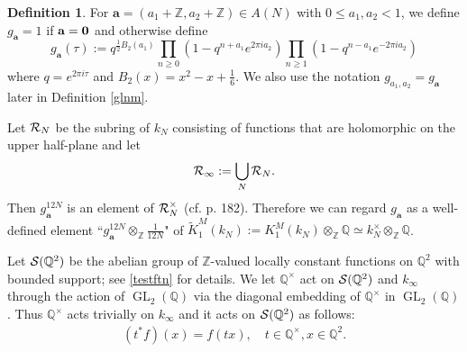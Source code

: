 \documentclass[12pt,amstex,amssymb]{article}
\theoremstyle{plain}
\theoremstyle{definition}
\newtheorem{definition}[theorem]{Definition}
\def\cR{{\cal R}}
\def\cS{{\cal S}}
\def\Z{{\mathbb Z}}
\def\Q{{\mathbb Q}}
\newcommand{\be}{\begin{eqnarray*}}
\newcommand{\ee}{\end{eqnarray*}}
\newcommand{\GL}{\operatorname{GL}}
\newcommand{\ba}{\mathbf{a}}
\newcommand{\bb}{\mathbf{b}}
\begin{document}
\begin{definition}\label{Siegelunits}\cite[Definition 1.1]{Bru}
For $\ba = (a_1 + \Z, a_2 +\Z)\in A(N)$ with $0\le a_1,a_2 < 1$, we define $g_\ba = 1$ if $\ba = {\bf 0}$ and otherwise define
$$
g_\ba(\tau) := q^{\frac{1}{2}B_2(a_1)} \prod_{n\ge 0} \left(1 - q^{n+a_1} e^{2\pi i a_2} \right) \prod_{n\ge 1} \left(1 - q^{n-a_1} e^{-2\pi i a_2} \right)
$$
where $q=e^{2 \pi i \tau}$ and $B_2(x)=x^2-x+\frac{1}{6}.$ We also use the notation $g_{a_1,a_2}=g_\ba$ later in Definition \ref{glnm}.
\end{definition}

Let $\cR_N$ be the subring of $k_N$ consisting of functions that are holomorphic on the upper half-plane and let
$$
\cR_\infty := \bigcup_N{\cR_N}.
$$
Then $g_\ba^{12N}$ is an element of $\cR_N^\times$ (cf. \cite{KubertLang} p. 182).
Therefore we can regard $g_\ba$ as a well-defined element ``$g_\ba^{12N} \otimes_\Z \frac{1}{12N}$" of $\tilde K^M_1(k_N):= K^M_1(k_N) \otimes_\Z \Q \simeq k_N^\times \otimes_\Z \Q$.

Let $\cS(\Q^2)$ be the abelian group of $\Z$-valued locally constant functions on $\Q^2$ with bounded support; see \eqref{testftn} for details.
We let $\Q^\times$ act on $\cS(\Q^2)$ and $k_\infty$ through the action of $\GL_2(\Q)$ via the diagonal embedding of $\Q^\times$ in $\GL_2(\Q)$. 
Thus $\Q^\times$ acts trivially on $k_\infty$ and it acts on $\cS(\Q^2)$ as follows:
\be
(t^* f)(x)=f(tx), \quad t \in \Q^\times, x \in \Q^2.
\ee
\end{document}
